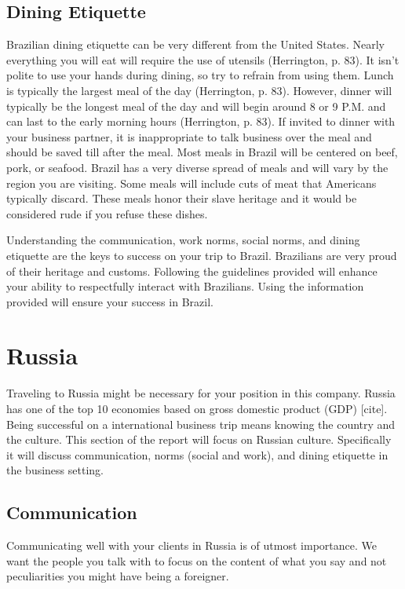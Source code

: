 \documentclass[11pt,a4paper,twoside]{report}
\begin{document}
\section{Dining Etiquette}
Brazilian dining etiquette can be very different from the United States.
Nearly everything you will eat will require the use of utensils
(Herrington, p. 83). It isn’t polite to use your hands during dining, so
try to refrain from using them. Lunch is typically the largest meal of the
day (Herrington, p. 83). However, dinner will typically be the longest meal
of the day and will begin around 8 or 9 P.M. and can last to the early
morning hours (Herrington, p. 83). If invited to dinner with your business
partner, it is inappropriate to talk business over the meal and should be
saved till after the meal. Most meals in Brazil will be centered on beef,
pork, or seafood. Brazil has a very diverse spread of meals and will vary
by the region you are visiting. Some meals will include cuts of meat that
Americans typically discard. These meals honor their slave heritage and it
would be considered rude if you refuse these dishes.

Understanding the communication, work norms, social norms, and dining etiquette
are the keys to success on your trip to Brazil. Brazilians are very proud of
their heritage and customs. Following the guidelines provided will enhance your
ability to respectfully interact with Brazilians. Using the information
provided will ensure your success in Brazil.

\chapter{Russia}

Traveling to Russia might be necessary for your position in this company.
Russia has one of the top 10 economies based on gross domestic product (GDP)
[cite]. Being successful on a international business trip means knowing the
country and the culture. This section of the report will focus on Russian
culture. Specifically it will discuss communication, norms (social and work),
and dining etiquette in the business setting.

\section{Communication}

Communicating well with your clients in Russia is of utmost importance. We want
the people you talk with to focus on the content of what you say and not
peculiarities you might have being a foreigner.
\end{document}
